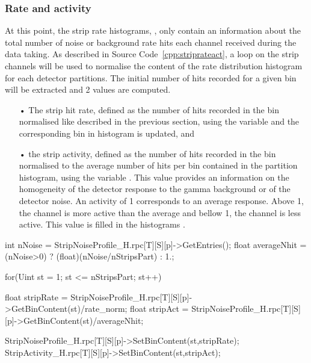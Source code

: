 		\subsubsection{Rate and activity}
		\label{app2:sssec:rateact}
		
	At this point, the strip rate histograms, , only contain an information about the total number of noise or background rate hits each channel received during the data taking. As described in Source Code~\ref{cpp:striprateact}, a loop on the strip channels will be used to normalise the content of the rate distribution histogram for each detector partitions. The initial number of hits recorded for a given bin will be extracted and 2 values are computed.

	\begin{itemize}
		\item[•] The strip hit rate, defined as the number of hits recorded in the bin normalised like described in the previous section, using the variable  and the corresponding bin in histogram  is updated, and
		\item[•] the strip activity, defined as the number of hits recorded in the bin normalised to the average number of hits per bin contained in the partition histogram, using the variable . This value provides an information on the homogeneity of the detector response to the gamma background or of the detector noise. An activity of 1 corresponds to an average response. Above 1, the channel is more active than the average and bellow 1, the channel is less active. This value is filled in the histograms .
	\end{itemize}
	
	\begin{code}
	\begin{cppcode}
int nNoise = StripNoiseProfile_H.rpc[T][S][p]->GetEntries();	
float averageNhit = (nNoise>0) ? (float)(nNoise/nStripsPart) : 1.;

for(Uint st = 1; st <= nStripsPart; st++){
	float stripRate =
		StripNoiseProfile_H.rpc[T][S][p]->GetBinContent(st)/rate_norm;
	float stripAct =
		StripNoiseProfile_H.rpc[T][S][p]->GetBinContent(st)/averageNhit;

	StripNoiseProfile_H.rpc[T][S][p]->SetBinContent(st,stripRate);
	StripActivity_H.rpc[T][S][p]->SetBinContent(st,stripAct);
}
	\end{cppcode}
	\label{cpp:striprateact}
	\vspace{5mm}
	\end{code}
	
